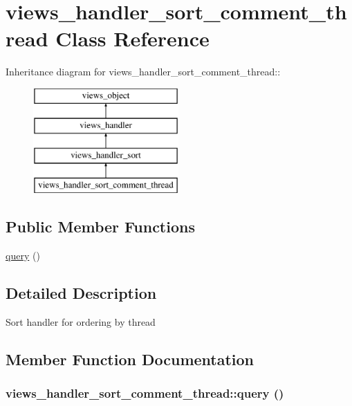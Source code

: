 \hypertarget{classviews__handler__sort__comment__thread}{
\section{views\_\-handler\_\-sort\_\-comment\_\-thread Class Reference}
\label{classviews__handler__sort__comment__thread}
}
Inheritance diagram for views\_\-handler\_\-sort\_\-comment\_\-thread::\begin{figure}[H]
\begin{center}
\leavevmode
\includegraphics[height=4cm]{classviews__handler__sort__comment__thread}
\end{center}
\end{figure}
\subsection*{Public Member Functions}
\begin{CompactItemize}
\item 
\hyperlink{classviews__handler__sort__comment__thread_6ea2c9fdba530fd022c1eafd5b0c4cea}{query} ()
\end{CompactItemize}


\subsection{Detailed Description}
Sort handler for ordering by thread 

\subsection{Member Function Documentation}
\hypertarget{classviews__handler__sort__comment__thread_6ea2c9fdba530fd022c1eafd5b0c4cea}{
\subsubsection[{query}]{\setlength{\rightskip}{0pt plus 5cm}views\_\-handler\_\-sort\_\-comment\_\-thread::query ()}}
\label{classviews__handler__sort__comment__thread_6ea2c9fdba530fd022c1eafd5b0c4cea}


